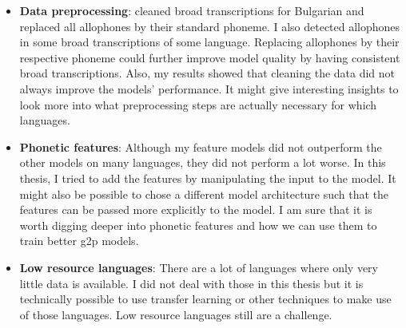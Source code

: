 \begin{itemize}
\item \textbf{Data preprocessing}: \cite{Ashby-Bartley.2021} cleaned broad transcriptions for Bulgarian and replaced all allophones by their standard phoneme. I also detected allophones in some broad transcriptions of some language. Replacing allophones by their respective phoneme could further improve model quality by having consistent broad transcriptions. Also, my results showed that cleaning the data did not always improve the models' performance. It might give interesting insights to look more into what preprocessing steps are actually necessary for which languages.
\item \textbf{Phonetic features}: Although my feature models did not outperform the other models on many languages, they did not perform a lot worse. In this thesis, I tried to add the features by manipulating the input to the model. It might also be possible to chose a different model architecture such that the features can be passed more explicitly to the model. I am sure that it is worth digging deeper into phonetic features and how we can use them to train better \ac{g2p} models.
\item \textbf{Low resource languages}: There are a lot of languages where only very little data is available. I did not deal with those in this thesis but it is technically possible to use transfer learning or other techniques to make use of those languages. Low resource languages still are a challenge.
\end{itemize}